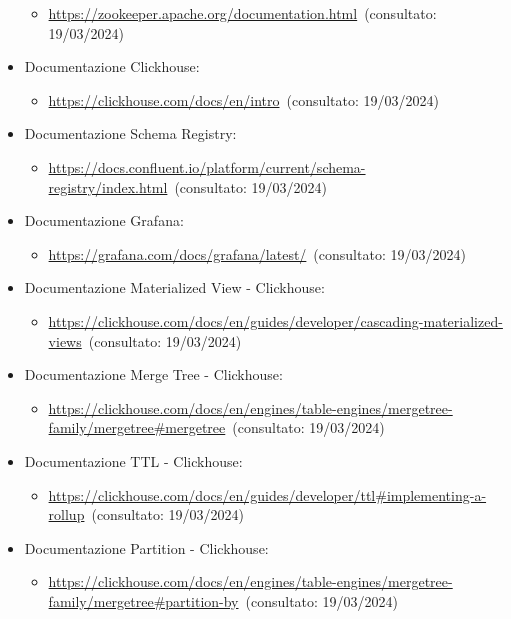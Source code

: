 \begin{itemize}
\begin{itemize}
        \item \url{https://zookeeper.apache.org/documentation.html}~(consultato: 19/03/2024)
    \end{itemize}
    \item Documentazione Clickhouse: 
    \begin{itemize}
        \item \url{https://clickhouse.com/docs/en/intro}~(consultato: 19/03/2024)
    \end{itemize}
    \item Documentazione Schema Registry: 
    \begin{itemize}
        \item \url{https://docs.confluent.io/platform/current/schema-registry/index.html}~(consultato: 19/03/2024)
    \end{itemize}
    \item Documentazione Grafana: 
    \begin{itemize}
        \item \url{https://grafana.com/docs/grafana/latest/}~(consultato: 19/03/2024)
    \end{itemize}
    \item Documentazione Materialized View - Clickhouse: 
    \begin{itemize}
        \item \url{https://clickhouse.com/docs/en/guides/developer/cascading-materialized-views}~(consultato: 19/03/2024)
    \end{itemize}
    \item Documentazione Merge Tree - Clickhouse: 
    \begin{itemize}
        \item \url{https://clickhouse.com/docs/en/engines/table-engines/mergetree-family/mergetree#mergetree}~(consultato: 19/03/2024)
    \end{itemize}
    \item Documentazione TTL - Clickhouse: 
    \begin{itemize}
        \item \url{https://clickhouse.com/docs/en/guides/developer/ttl#implementing-a-rollup}~(consultato: 19/03/2024)
    \end{itemize}
    \item Documentazione Partition - Clickhouse: 
    \begin{itemize}
        \item \url{https://clickhouse.com/docs/en/engines/table-engines/mergetree-family/mergetree#partition-by}~(consultato: 19/03/2024)

\end{itemize}
\end{itemize}
